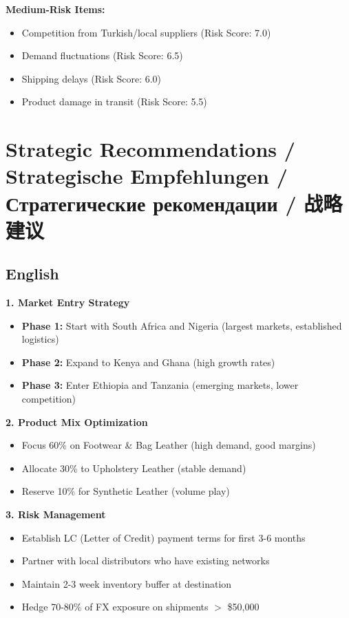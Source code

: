 \documentclass[12pt,a4paper]{article}
\begin{document}
\textbf{Medium-Risk Items:}
\begin{itemize}
    \item Competition from Turkish/local suppliers (Risk Score: 7.0)
    \item Demand fluctuations (Risk Score: 6.5)
    \item Shipping delays (Risk Score: 6.0)
    \item Product damage in transit (Risk Score: 5.5)
\end{itemize}


\newpage

\section{Strategic Recommendations / Strategische Empfehlungen / Стратегические рекомендации / 战略建议}

\subsection*{English}

\textbf{1. Market Entry Strategy}
\begin{itemize}
    \item \textbf{Phase 1:} Start with South Africa and Nigeria (largest markets, established logistics)
    \item \textbf{Phase 2:} Expand to Kenya and Ghana (high growth rates)
    \item \textbf{Phase 3:} Enter Ethiopia and Tanzania (emerging markets, lower competition)
\end{itemize}

\textbf{2. Product Mix Optimization}
\begin{itemize}
    \item Focus 60\% on Footwear \& Bag Leather (high demand, good margins)
    \item Allocate 30\% to Upholstery Leather (stable demand)
    \item Reserve 10\% for Synthetic Leather (volume play)
\end{itemize}

\textbf{3. Risk Management}
\begin{itemize}
    \item Establish LC (Letter of Credit) payment terms for first 3-6 months
    \item Partner with local distributors who have existing networks
    \item Maintain 2-3 week inventory buffer at destination
    \item Hedge 70-80\% of FX exposure on shipments $>$ \$50,000
\end{itemize}
\end{document}
